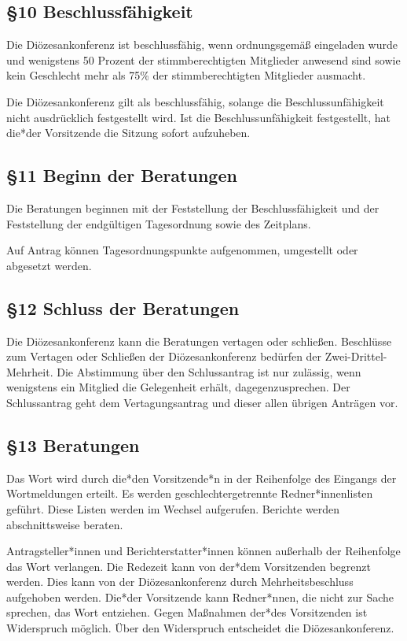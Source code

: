 \documentclass[12pt]{report}
\begin{document}
\begin{flushleft}
\subsection*{§10 Beschlussfähigkeit}
Die Diözesankonferenz ist beschlussfähig, wenn ordnungsgemäß eingeladen wurde und wenigstens 50 Prozent
der stimmberechtigten Mitglieder anwesend sind sowie {\color{red}kein Geschlecht mehr als 75\% der stimmberechtigten Mitglieder ausmacht}.

Die Diözesankonferenz gilt als beschlussfähig, solange die Beschlussunfähigkeit nicht ausdrücklich
festgestellt wird. Ist die Beschlussunfähigkeit festgestellt, hat {\color{red}die*der} Vorsitzende die Sitzung sofort aufzuheben.

\subsection*{§11 Beginn der Beratungen}
Die Beratungen beginnen mit der Feststellung der Beschlussfähigkeit und der Feststellung der endgültigen
Tagesordnung sowie des Zeitplans.

Auf Antrag können Tagesordnungspunkte aufgenommen, umgestellt oder abgesetzt werden.
\subsection*{§12 Schluss der Beratungen}
Die Diözesankonferenz kann die Beratungen vertagen oder schließen. Beschlüsse zum Vertagen oder Schließen
der Diözesankonferenz bedürfen der Zwei-Drittel-Mehrheit. Die Abstimmung über den Schlussantrag ist
nur zulässig, wenn wenigstens ein Mitglied die Gelegenheit erhält, dagegenzusprechen. Der Schlussantrag
geht dem Vertagungsantrag und dieser allen übrigen Anträgen vor.
\subsection*{§13 Beratungen}
Das Wort wird durch {\color{red}die*den Vorsitzende*n} in der Reihenfolge des Eingangs der Wortmeldungen erteilt.
{\color{red} Es werden geschlechtergetrennte Redner*innenlisten geführt. Diese Listen werden im Wechsel aufgerufen.}
Berichte werden abschnittsweise beraten.

{\color{red}Antragsteller*innen und Berichterstatter*innen} können außerhalb der Reihenfolge das Wort verlangen. Die Redezeit
kann von {\color{red}der*dem} Vorsitzenden begrenzt werden. Dies kann von der Diözesankonferenz durch Mehrheitsbeschluss
aufgehoben werden. {\color{red}Die*der} Vorsitzende kann {\color{red}Redner*nnen}, die nicht zur Sache sprechen, das
Wort entziehen. Gegen Maßnahmen {\color{red}der*des} Vorsitzenden ist Widerspruch möglich. Über den Widerspruch
entscheidet die Diözesankonferenz.


\end{flushleft}
\end{document}

